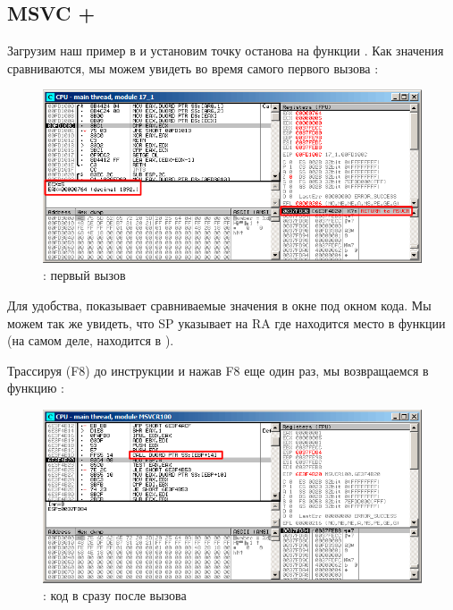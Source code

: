 ﻿\clearpage
\subsection{MSVC + \olly}
\myindex{\olly}

Загрузим наш пример в \olly и установим точку останова на функции \comp{}.
Как значения сравниваются, мы можем увидеть во время самого первого вызова \comp{}:

\begin{figure}[H]
\centering
\includegraphics[scale=\FigScale]{patterns/18_pointers_to_functions/olly1.png}
\caption{\olly: первый вызов \comp}
\label{fig:qsort_olly1}
\end{figure}

Для удобства, \olly показывает сравниваемые значения в окне под окном кода.
Мы можем так же увидеть, что \ac{SP} указывает на \ac{RA} где находится место в функции \qsort (на самом деле, находится в ).

\clearpage
Трассируя (F8) до инструкции  и нажав F8 еще один раз, мы возвращаемся в функцию \qsort:

\begin{figure}[H]
\centering
\includegraphics[scale=\FigScale]{patterns/18_pointers_to_functions/olly2.png}
\caption{\olly: код в \qsort сразу после вызова \comp}
\label{fig:qsort_olly2}
\end{figure}

